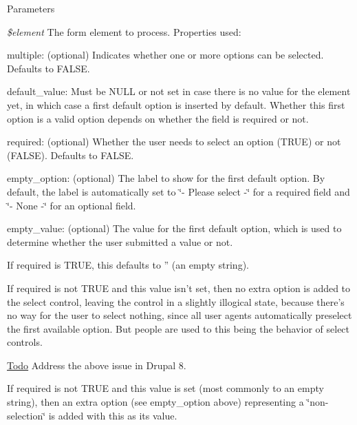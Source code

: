 \begin{DoxyParams}{Parameters}
\item[{\em \$element}]The form element to process. Properties used:
\begin{DoxyItemize}
\item multiple: (optional) Indicates whether one or more options can be selected. Defaults to FALSE.
\item default\_\-value: Must be NULL or not set in case there is no value for the element yet, in which case a first default option is inserted by default. Whether this first option is a valid option depends on whether the field is required or not.
\item required: (optional) Whether the user needs to select an option (TRUE) or not (FALSE). Defaults to FALSE.
\item empty\_\-option: (optional) The label to show for the first default option. By default, the label is automatically set to \char`\"{}-\/ Please select -\/\char`\"{} for a required field and \char`\"{}-\/ None -\/\char`\"{} for an optional field.
\item empty\_\-value: (optional) The value for the first default option, which is used to determine whether the user submitted a value or not.
\begin{DoxyItemize}
\item If required is TRUE, this defaults to '' (an empty string).
\item If required is not TRUE and this value isn't set, then no extra option is added to the select control, leaving the control in a slightly illogical state, because there's no way for the user to select nothing, since all user agents automatically preselect the first available option. But people are used to this being the behavior of select controls. 
\end{DoxyItemize}
\end{DoxyItemize}\end{DoxyParams}
\begin{Desc}
\item[\hyperlink{todo__todo000006}{Todo}]Address the above issue in Drupal 8.
\begin{DoxyItemize}
\item If required is not TRUE and this value is set (most commonly to an empty string), then an extra option (see empty\_\-option above) representing a \char`\"{}non-\/selection\char`\"{} is added with this as its value.
\end{DoxyItemize}\end{Desc}
